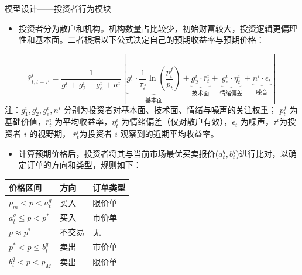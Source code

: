 \begin{frame}{模型设计——投资者行为模块}
    \vspace{-0.4em}
    \footnotesize
    \setlength{\parskip}{0.2em}
    \linespread{0.9}
    
    \begin{itemize}
        \item 投资者分为散户和机构。机构数量占比较少，初始财富较大，投资逻辑更偏\alert{理性和基本面}。二者根据以下公式决定自己的预期收益率与预期价格：
    \end{itemize}
    
    \vspace{-0.4em}
    
    \[
    \hat{r}_{t,t+\tau^i}^i = 
        \frac{1}{g_1^i + g_2^i + g_e^i + n^i } 
        \left[
        \underbrace{g_1^i \cdot \frac{1}{\tau_f} \ln\left(\frac{p_t^f}{p_t}\right)}_{\text{基本面}} 
        + \underbrace{g_2^i \cdot \bar{r}_t^i}_{\text{技术面}} 
        + \underbrace{g_e^i \cdot \eta_t^i}_{\text{情绪偏差}}
        + \underbrace{n^i \cdot \epsilon_t}_{\text{噪音}} 
        \right]
    \]
    \scriptsize
    注：\(g_1^i, g_2^i, g_e^i, n^i\) 分别为投资者对基本面、技术面、情绪与噪声的关注权重；
    \(p_t^f\) 为基础价值，\(\bar{r}_t^i\) 为平均收益率，\(\eta_t^i\) 为情绪偏差（仅对散户有效），\(\epsilon_t\) 为噪声，\( \tau^i \)为投资者 \(i\) 的视野期， \( \bar{r}_t^i \)为投资者 \(i\) 观察到的近期平均收益率。

    \vspace{-0.4em}
    
    
    \footnotesize

    \begin{itemize}
        \item 计算预期价格后，投资者将其与当前市场最优买卖报价($a_t^q, b_t^q$)进行比对，以确定订单的方向和类型，规则如下：
    \end{itemize}
    
    \vspace{-0.6em}
    \center
    \begin{tabular}{@{} >{\centering\arraybackslash}p{4.5cm} 
        >{\centering\arraybackslash}p{3.5cm} 
        >{\centering\arraybackslash}p{4.5cm} @{}}
        \toprule
        价格区间 & 方向 & 订单类型 \\
        \midrule
        \( p_m < p < a_t^q \) & 买入 & 限价单 \\
        \( a_t^q \le p < p^* \) & 买入 & 市价单 \\
        \( p \approx p^* \) & 不交易 & 无 \\
        \( p^* < p \le b_t^q \) & 卖出 & 市价单 \\
        \( b_t^q < p < p_M \) & 卖出 & 限价单 \\
        \bottomrule
    \end{tabular}


\end{frame}
